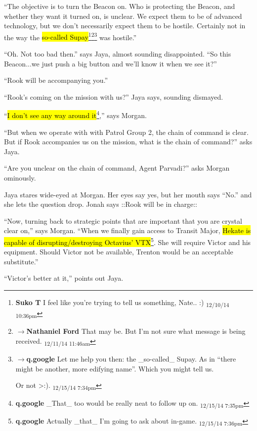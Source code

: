 ``The objective is to turn the Beacon on.  Who is protecting the Beacon, and whether they want it turned on, is unclear.  We expect them to be of advanced technology, but we don't necessarily expect them to be hostile. Certainly not in the way the \hl{so-called Supay}\footnote{\textbf{Suko T }I feel like you're trying to tell us something, Nate.. :) \textsubscript{12/10/14 10:36pm}}\footnote{$\rightarrow$\textbf{Nathaniel Ford }That may be. But I'm not sure what message is being received. \textsubscript{12/11/14 11:46am}}\footnote{$\rightarrow$\textbf{q.google }Let me help you then: the \_so-called\_ Supay.  As in ``there might be another, more edifying name''.  Which you might tell us.  

Or not \textgreater :). \textsubscript{12/15/14 7:34pm}} was hostile.''

``Oh.  Not too bad then.'' says Jaya, almost sounding disappointed.  ``So this Beacon...we just push a big button and we'll know it when we see it?''

``Rook will be accompanying you.''

``Rook's coming on the mission with us?'' Jaya says, sounding dismayed.

``\hl{I don't see any way around it}\footnote{\textbf{q.google }\_That\_ too would be really neat to follow up on. \textsubscript{12/15/14 7:35pm}},'' says Morgan.

``But when we operate with with Patrol Group 2, the chain of command is clear.  But if Rook accompanies us on the mission, what is the chain of command?'' asks Jaya.

``Are you unclear on the chain of command, Agent Parvadi?'' asks Morgan ominously.

Jaya stares wide-eyed at Morgan. Her eyes say yes, but her mouth says ``No.'' and she lets the question drop.  Jonah says  {\color[RGB]{74,134,232}::Rook will be in charge::} 



``Now, turning back to strategic points that are important that you are crystal clear on,'' says Morgan.  ``When we finally gain access to Transit Major, \hl{Hekate is capable of disrupting/destroying Octavius' VTX}\footnote{\textbf{q.google }Actually \_that\_ I'm going to ask about in-game. \textsubscript{12/15/14 7:36pm}}.  She will require Victor and his equipment.  Should Victor not be available, Trenton would be an acceptable substitute.''

``Victor's better at it,'' points out Jaya.

